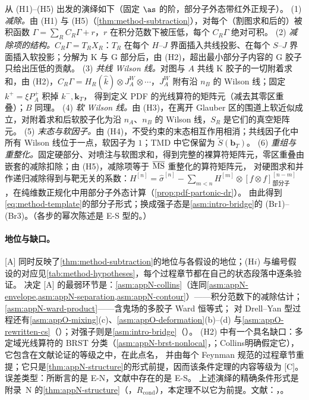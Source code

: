 \begin{proofsketch}
从 (H1)--(H5) 出发的演绎如下（固定 $\as$ 的阶，部分子外态带红外正规子）。
(1) \emph{减除。}由 (H1) 与 (H5)（\cref{thm:method-subtraction}），对每个（割图求和后的）被积函数 $\Gamma=\sum_RC_R\Gamma+r$，$r$ 在积分范数下被压低，每个 $C_R\Gamma$ 绝对可积。
(2) \emph{减除项的结构。}$C_R\Gamma=T_RX_R$：$T_R$ 在每个 $H$--$J$ 界面插入共线投影、在每个 $S$--$J$ 界面插入软投影；分解为 K 与 G 部分后，由 (H2)，超出最小部分子内容的 G 胶子只给出压低的贡献。
(3) \emph{共线 Wilson 线。}对图与 $A$ 共线 K 胶子的一切附着求和，由 (H2)，$C_R\Gamma=H_R(\hat k)\otimes J_A^W\otimes\cdots$，$J_A^W$ 附有沿 $n_B$ 的 Wilson 线；固定 $k^+=\xi P_A^+$ 积掉 $k^-,\mathbf k_T$，
得到定义 PDF 的光线算符的矩阵元（减去其零区重叠）；$B$ 同理。
(4) \emph{软 Wilson 线。}由 (H3)，在离开 Glauber 区的围道上软近似成立，对附着求和后软胶子化为沿 $n_A$、$n_B$ 的 Wilson 线，$S_R$ 是它们的真空矩阵元。
(5) \emph{末态与软因子。}由 (H4)，不受约束的末态相互作用相消；共线因子化中所有 Wilson 线位于一点，软因子为 $1$；TMD 中它保留为 $\tilde S(\mathbf b_T)$。
(6) \emph{重组与重整化。}固定硬部分、对喷注与软图求和，得到完整的裸算符矩阵元，零区重叠由嵌套的减除扣除；由 (H5)，减除项等于 $\overline{\rm MS}$ 重整化的算符矩阵元，
对硬图求和并作递归减除得到与靶无关的系数：$H^{[n]}=\hat\sigma^{[n]}-\sum_{m<n}H^{[m]}\otimes[f\otimes f]^{[n-m]}_{\text{部分子}}$，在纯维数正规化中用部分子外态计算（\cref{prop:pdf-partonic-dr}）。
由此得到\cref{eq:method-template}的部分子形式；换成强子态是\cref{asm:intro-bridge}的 (Br1)--(Br3)。（各步的幂次陈述是 E-S 型的。）
\end{proofsketch}

\paragraph{地位与缺口。}[A] 同时反映了\cref{thm:method-subtraction}的地位与各假设的地位；(H$i$) 与编号假设的对应见\cref{tab:method-hypotheses}，每个过程章节都在自己的状态段落中逐条验证。
决定 [A] 的最弱环节是：\cref{asm:appN-collins}（连同\cref{asm:appN-envelope,asm:appN-separation,asm:appN-contour}）——积分范数下的减除估计；\cref{asm:appN-ward-product}——含鬼场的多胶子 Ward 恒等式；
对 Drell--Yan 型过程还有\cref{asm:appO-mixing}(c)、\cref{asm:appO-deformation}(b)--(d) 与\cref{asm:appO-rewritten-cs}（\cite[第~14.4.8~节]{Collins2011}）；对强子则是\cref{asm:intro-bridge}（\tagC）。
(H2) 中有一个具名缺口：多定域光线算符的 BRST 分类（\cref{asm:appN-brst-nonlocal}，\tagC；Collins\cite[第~11.3.2~节]{Collins2011}明确假定它），它包含在文献论证的等级之中，在此点名，
并由每个 Feynman 规范的过程章节重提；它只是\cref{thm:appN-structure}的形式前提，因而该条件定理的内容等级为 [C]。误差类型：所断言的是 E-N，文献中存在的是 E-S。
上述演绎的精确条件形式是附录~N 的\cref{thm:appN-structure}（\tagR，$R_{\mathrm{cond}}$），本定理不以它为前提。文献：\cite{CollinsSoperSterman1989}，\cite[第~10、11、14~章]{Collins2011}。


